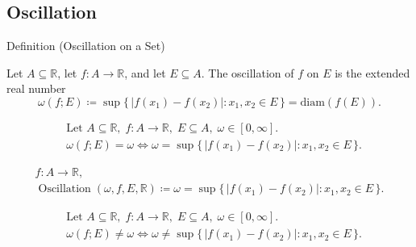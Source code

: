 
\subsection*{Oscillation}
\label{sec:oscillation}

\begin{definitionbox}{Definition (Oscillation on a Set)}
\begin{definition}
\label{def:oscillation-on-a-set}
Let $A\subseteq\mathbb{R}$, let $f:A\to\mathbb{R}$, and let
$E\subseteq A$. The oscillation of $f$ on $E$ is the extended real number
\[
\omega(f;E)\coloneqq
\sup\{\,|f(x_1)-f(x_2)|:x_1,x_2\in E\,\}
=\mathrm{diam}(f(E)).
\]
\end{definition}
\end{definitionbox}

\begin{remark*}
\[
\begin{aligned}
&\text{Let } A\subseteq\mathbb{R},\; f:A\to\mathbb{R},\; E\subseteq A,\;
\omega\in[0,\infty].\\
&\omega(f;E)=\omega
\Longleftrightarrow
\omega=\sup\{\,|f(x_1)-f(x_2)|:x_1,x_2\in E\,\}.
\end{aligned}
\]
\end{remark*}

\begin{remark*}
\[
\begin{aligned}
  f\colon A\to\mathbb{R},\\
\operatorname{Oscillation}(\omega,f,E,\mathbb{R})
\coloneqq
\omega=\sup\{\,|f(x_1)-f(x_2)|:x_1,x_2\in E\,\}.
\end{aligned}
\]
\end{remark*}

\begin{remark*}
\[
\begin{aligned}
&\text{Let } A\subseteq\mathbb{R},\; f:A\to\mathbb{R},\; E\subseteq A,\;
\omega\in[0,\infty].\\
&\omega(f;E)\ne\omega
\Longleftrightarrow
\omega\ne\sup\{\,|f(x_1)-f(x_2)|:x_1,x_2\in E\,\}.
\end{aligned}
\]
\end{remark*}

